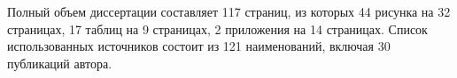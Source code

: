Полный объем диссертации составляет 117 страниц, из которых 44 рисунка на 32 страницах, 17 таблиц на 9 страницах, 2 приложения на 14 страницах. Список использованных источников состоит из 121 наименований, включая 30 публикаций автора.




%
